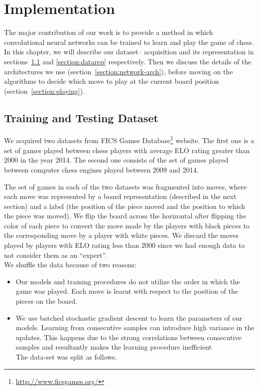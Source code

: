 \chapter{Implementation}
\label{chap:implementation}
The major contribution of our work is to provide a method in which 
convolutional neural networks can be trained to learn and play the game of 
chess. In this chapter, we will describe our dataset-- acquisition and its 
representation in sections~\ref{section:dataaq} and \ref{section:datarep} 
respectively. Then we discuss the details of the architectures we use 
(section~\ref{section:network-arch}), before moving on the algorithms to decide 
which move to play at the current board position 
(section~\ref{section:playing}).


\section{Training and Testing Dataset}
\label{section:dataaq}
We acquired two datasets from FICS Games 
Database\footnote{\url{http://www.ficsgames.org/}} website. The first 
one is a set of games played between chess players with average ELO rating 
greater than 2000 in the year 2014. The second one consists of 
the set of games played between computer chess engines played between 2009 and 
2014.


The set of games in each of the two datasets was fragmented into moves, where 
each move was represented by a board representation (described in the next 
section) and a label (the position of the piece moved and the position to which 
the piece was moved). We flip the board across the horizontal after flipping 
the color of each piece to convert the move made by the players with black 
pieces to the corresponding move by a player with white pieces. We discard the 
moves played by players with ELO rating less than 2000 since we had enough data 
to not consider them as an ``expert''. \\
We shuffle the data because of two reasons:
\begin{itemize} 
\item Our models and training procedures do not utilize the order in which the 
game was played. Each move is learnt with respect to the position of the pieces 
on the board.
\item We use batched stochastic gradient descent to learn the parameters of our 
models. Learning from consecutive samples can introduce high variance in the 
updates. This happens due to the strong correlations between consecutive 
samples 
and resultantly makes the learning procedure inefficient \cite{deepmind_nips}\\
The data-set was split as follows.
\end{itemize}

